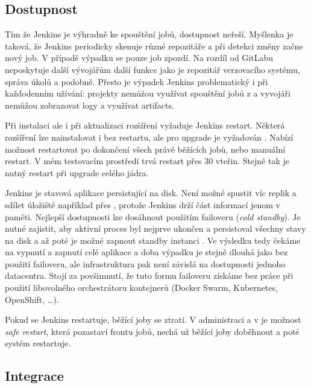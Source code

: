    \subsection{Dostupnost}
        Tím že Jenkins je výhradně ke spouštění jobů, dostupnost neřeší. Myšlenka je taková, že Jenkins periodicky skenuje různé repozitáře a při detekci změny začne nový job. V případě výpadku se pouze job zpozdí. Na rozdíl od GitLabu neposkytuje další vývojářům další funkce jako je repozitář verzovacího systému, správa úkolů a podobně. Přesto je výpadek Jenkins problematický i při každodenním užívání: projekty nemůžou využívat spouštění jobů z  a vyvojáři nemůžou zobrazovat logy a využívat artifacts.

        Při instalaci ale i při aktualizaci rozšíření vyžaduje Jenkins restart. Některá rozšíření lze nainstalovat i bez restartu, ale pro upgrade je vyžadován \cite{jenkins-norestart}. Nabízí možnost restartovat po dokončení všech právě běžících jobů, nebo manuální restart. V mém testovacím prostředí trvá restart přes 30 vteřin. Stejně tak je nutný restart při upgrade celého jádra.

        Jenkins je stavová aplikace persistující na disk. Není možné spustit víc replik a sdílet úložiště například přes , protože Jenkins drží část informací jenom v paměti. Nejlepší dostupnosti lze dosáhnout použitím failoveru (\textit{cold standby}). Je nutné zajistit, aby aktivní proces byl nejprve ukončen a persistoval všechny stavy na disk a až poté je možné zapnout standby instanci \cite{jenkins-ha}. Ve výsledku tedy čekáme na vypnutí a zapnutí celé aplikace a doba výpadku je stejně dlouhá jako bez použití failoveru, ale infrastruktura pak není závislá na dostupnosti jednoho datacentra. Stojí za povšimnutí, že tuto formu failoveru získáme bez práce při použití libovolného orchestrátoru kontejnerů (Docker Swarm, Kubernetes, OpenShift, \ldots).

        Pokud se Jenkins restartuje, běžící joby se ztratí. V administraci a v  je možnost \textit{safe restart}, která pozastaví frontu jobů, nechá už běžící joby doběhnout a poté systém restartuje.

        \blind[1]

    \subsection{Integrace}
        \blind[2]
        \blind[2]
        \blind[1]

